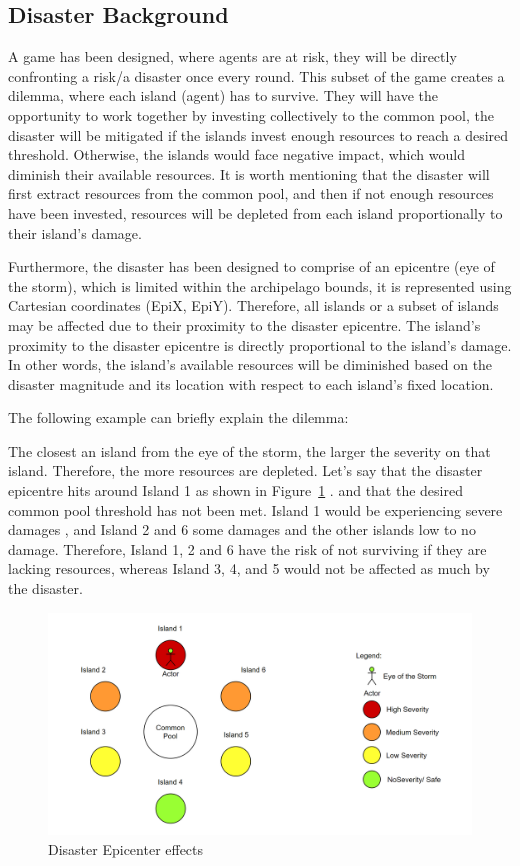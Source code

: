 \subsection{Disaster Background}

A game has been designed, where agents are at risk, they will be directly confronting a risk/a disaster once every round. This subset of the game creates a dilemma, where each island (agent) has to survive. They will have the opportunity to work together by investing collectively to the common pool, the disaster will be mitigated if the islands invest enough resources to reach a desired threshold. Otherwise, the islands would face negative impact, which would diminish their available resources. It is worth mentioning that the disaster will first extract resources from the common pool, and then if not enough resources have been invested, resources will be depleted from each island proportionally to their island’s damage.

Furthermore, the disaster has been designed to comprise of an epicentre (eye of the storm), which is limited within the archipelago bounds, it is represented using Cartesian coordinates (EpiX, EpiY). Therefore, all islands or a subset of islands may be affected due to their proximity to the disaster epicentre. The island’s proximity to the disaster epicentre is directly proportional to the island’s damage. In other words, the island's available resources will be diminished based on the disaster magnitude and its location with respect to each island’s fixed location.

The following example can briefly explain the dilemma:

The closest an island from the eye of the storm, the larger the severity on that island. Therefore, the more resources are depleted. Let’s say that the disaster epicentre hits around Island 1 as shown in Figure~\ref{fig:Disaster eye of the storm severity} . and that the desired common pool threshold has not been met. Island 1 would be experiencing severe damages , and Island 2 and 6 some damages and the other islands low to no damage. Therefore, Island 1, 2 and 6 have the risk of not surviving if they are lacking resources, whereas Island 3, 4, and 5 would not be affected as much by the disaster.

\begin{figure}[!htb]
    \centering
    \includegraphics[width=1\textwidth]{04_environment/Images/Disaster eye of the storm severity.PNG}
    \caption{Disaster Epicenter effects}
    \label{fig:Disaster eye of the storm severity}
\end{figure}

